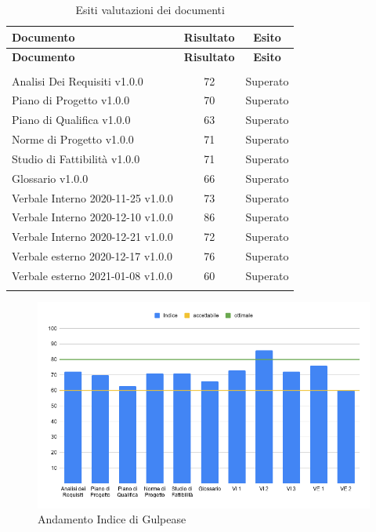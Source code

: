 \documentclass[../piano_di_qualifica.tex]{subfiles}
\begin{document}
\begin{center}
	\begin{longtable}{|l|c|c|}
		\hline
		\rowcolor{lightgray}
		\textbf{Documento}                 & \textbf{Risultato} & \textbf{Esito} \\
		\hline
		\endfirsthead

		\hline
		\rowcolor{lightgray}
		\textbf{Documento}                 & \textbf{Risultato} & \textbf{Esito} \\
		\hline
		\endhead

		\hline
		\rowcolor{white}
		\multicolumn{3}{|c|}{\emph{Continua alla pagina successiva...}} \\
		\hline
		\endfoot
		\endlastfoot

		Analisi Dei Requisiti v1.0.0       & 72                 & Superato       \\
		Piano di Progetto v1.0.0           & 70                 & Superato       \\
		Piano di Qualifica v1.0.0          & 63                 & Superato       \\
		Norme di Progetto v1.0.0           & 71                 & Superato       \\
		Studio di Fattibilità v1.0.0       & 71                 & Superato       \\
		Glossario v1.0.0                   & 66                 & Superato       \\
		Verbale Interno 2020-11-25 v1.0.0  & 73                 & Superato       \\
		Verbale Interno 2020-12-10 v1.0.0  & 86                 & Superato       \\
		Verbale Interno 2020-12-21 v1.0.0  & 72                 & Superato       \\
		Verbale esterno 2020-12-17  v1.0.0 & 76                 & Superato       \\
		Verbale esterno 2021-01-08  v1.0.0 & 60                 & Superato       \\
		\hline
		\rowcolor{white}
		\caption{Esiti valutazioni dei documenti}
	\end{longtable}
\end{center}

\begin{figure}[H]
	\centering
	\includegraphics[width=14cm]{src/img/media_gul_RR.png}
	\caption{Andamento Indice di Gulpease}
\end{figure}
\end{document}
